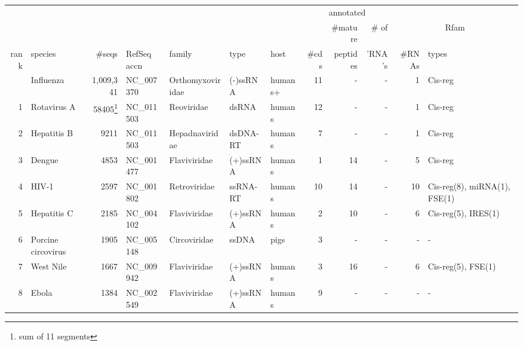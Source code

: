 
\begin{center}
\begin{tabular}{r|l|r|l|l|l|l|r|r|r|r|l}
       &                    &              &                &                &          &        & \multicolumn{3}{c}{annotated} & & \\
       &                    &              &                &                &          &        &       & \#mature & \# of    & \multicolumn{2}{c}{Rfam} \\ 
  rank & species            &       \#seqs & RefSeq accn    & family         & type     & host   & \#cds & peptides & 'RNA's   & \#RNAs & types \\ \hline
       & Influenza          & 1,009,341    & NC\_007370     & Orthomyxoviridae & (-)ssRNA & humans+&   11 &       - &        - & 1 & Cis-reg \\ 
     1 & Rotavirus A        &58405\footnote{sum of 11 segments}& NC\_011503&Reoviridae&dsRNA&humans&   12 &       - &        - & 1 & Cis-reg  \\ %
     2 & Hepatitis B        &         9211 & NC\_011503      & Hepadnaviridae & dsDNA-RT & humans &     7 &       - &        - & 1 & Cis-reg \\ %
     3 & Dengue             &         4853 & NC\_001477      & Flaviviridae   & (+)ssRNA & humans &     1 &      14 &        - & 5 & Cis-reg  \\ 
     4 & HIV-1              &        2597  & NC\_001802      & Retroviridae   & ssRNA-RT & humans &    10 &      14 &        - & 10 & Cis-reg(8), miRNA(1), FSE(1) \\
     5 & Hepatitis C        &        2185  & NC\_004102      & Flaviviridae   & (+)ssRNA & humans &     2 &      10 &        - & 6  & Cis-reg(5), IRES(1) \\
     6 & Porcine circovirus &        1905  & NC\_005148      & Circoviridae   & ssDNA    & pigs   &     3 &       - &        - & -  & - \\
     7 & West Nile          &        1667  & NC\_009942      & Flaviviridae   & (+)ssRNA & humans &     3 &      16 &        - & 6  & Cis-reg(5), FSE(1) \\
     8 & Ebola              &        1384  & NC\_002549      & Flaviviridae   & (+)ssRNA & humans &     9 &       - &        - & -  & - \\ 

\end{tabular}
\end{center}
